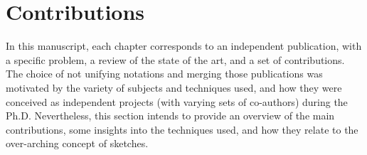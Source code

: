  \section{Contributions}\label{intro:sec:contrib}

In this manuscript, each chapter corresponds to an independent publication, with a specific problem, a review of the state of the art, and a set of contributions. The choice of not unifying notations and merging those publications was motivated by the variety of subjects and techniques used, and how they were conceived as independent projects (with varying sets of co-authors) during the Ph.D. Nevertheless, this section intends to provide an overview of the main contributions, some insights into the techniques used, and how they relate to the over-arching concept of sketches.


